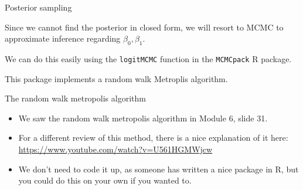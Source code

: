 \documentclass[
  ignorenonframetext,
]{beamer}
\begin{document}
\begin{frame}{Posterior sampling}
\protect\hypertarget{posterior-sampling}{}

Since we cannot find the posterior in closed form, we will resort to
MCMC to approximate inference regarding \(\beta_0, \beta_1.\)

We can do this easily using the \texttt{logitMCMC} function in the
\texttt{MCMCpack} R package.

This package implements a random walk Metroplis algorithm.

\end{frame}

\begin{frame}{The random walk metropolis algorithm}
\protect\hypertarget{the-random-walk-metropolis-algorithm}{}

\begin{itemize}
\item
  We saw the random walk metropolis algorithm in Module 6, slide 31.
\item
  For a different review of this method, there is a nice explanation of
  it here: \url{https://www.youtube.com/watch?v=U561HGMWjcw}
\item
  We don't need to code it up, as someone has written a nice package in
  R, but you could do this on your own if you wanted to.
\end{itemize}

\end{frame}
\end{document}
